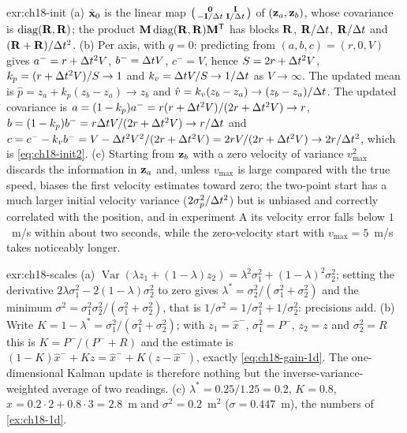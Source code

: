 \begin{solution}{exr:ch18-init}
(a) $\hat{\mathbf{x}}_0$ is the linear map $\begin{psmallmatrix}\mathbf{0}&\mathbf{I}\\ -\mathbf{I}/\Delta t&\mathbf{I}/\Delta t\end{psmallmatrix}$ of $(\mathbf{z}_a,\mathbf{z}_b)$, whose covariance is $\operatorname{diag}(\mathbf{R},\mathbf{R})$; the product $\mathbf{M}\operatorname{diag}(\mathbf{R},\mathbf{R})\mathbf{M}^{\mathsf{T}}$ has blocks $\mathbf{R}$, $\mathbf{R}/\Delta t$, $\mathbf{R}/\Delta t$ and $(\mathbf{R}+\mathbf{R})/\Delta t^2$. (b) Per axis, with $q=0$: predicting from $(a,b,c)=(r,0,V)$ gives $a^-=r+\Delta t^2V$, $b^-=\Delta t V$, $c^-=V$, hence $S=2r+\Delta t^2V$, $k_p=(r+\Delta t^2V)/S\to1$ and $k_v=\Delta t V/S\to1/\Delta t$ as $V\to\infty$. The updated mean is $\hat p=z_a+k_p(z_b-z_a)\to z_b$ and $\hat v=k_v(z_b-z_a)\to(z_b-z_a)/\Delta t$. The updated covariance is $a=(1-k_p)a^-=r(r+\Delta t^2V)/(2r+\Delta t^2V)\to r$, $b=(1-k_p)b^-=r\Delta t V/(2r+\Delta t^2V)\to r/\Delta t$ and $c=c^--k_vb^-=V-\Delta t^2V^2/(2r+\Delta t^2V)=2rV/(2r+\Delta t^2V)\to2r/\Delta t^2$, which is \cref{eq:ch18-init2}. (c) Starting from $\mathbf{z}_b$ with a zero velocity of variance $v_{\max}^2$ discards the information in $\mathbf{z}_a$ and, unless $v_{\max}$ is large compared with the true speed, biases the first velocity estimates toward zero; the two-point start has a much larger initial velocity variance ($2\sigma_p^2/\Delta t^2$) but is unbiased and correctly correlated with the position, and in experiment A its velocity error falls below $1$~m/s within about two seconds, while the zero-velocity start with $v_{\max}=5$~m/s takes noticeably longer.
\end{solution}

\begin{solution}{exr:ch18-scales}
(a) $\operatorname{Var}(\lambda z_1+(1-\lambda)z_2)=\lambda^2\sigma_1^2+(1-\lambda)^2\sigma_2^2$; setting the derivative $2\lambda\sigma_1^2-2(1-\lambda)\sigma_2^2$ to zero gives $\lambda^*=\sigma_2^2/(\sigma_1^2+\sigma_2^2)$ and the minimum $\sigma^2=\sigma_1^2\sigma_2^2/(\sigma_1^2+\sigma_2^2)$, that is $1/\sigma^2=1/\sigma_1^2+1/\sigma_2^2$: precisions add. (b) Write $K=1-\lambda^*=\sigma_1^2/(\sigma_1^2+\sigma_2^2)$; with $z_1=\hat x^-$, $\sigma_1^2=P^-$, $z_2=z$ and $\sigma_2^2=R$ this is $K=P^-/(P^-+R)$ and the estimate is $(1-K)\hat x^-+Kz=\hat x^-+K(z-\hat x^-)$, exactly \cref{eq:ch18-gain-1d}. The one-dimensional Kalman update is therefore nothing but the inverse-variance-weighted average of two readings. (c) $\lambda^*=0.25/1.25=0.2$, $K=0.8$, $\hat x=0.2\cdot2+0.8\cdot3=2.8$~m and $\sigma^2=0.2$~m$^2$ ($\sigma=0.447$~m), the numbers of \cref{ex:ch18-1d}.
\end{solution}

